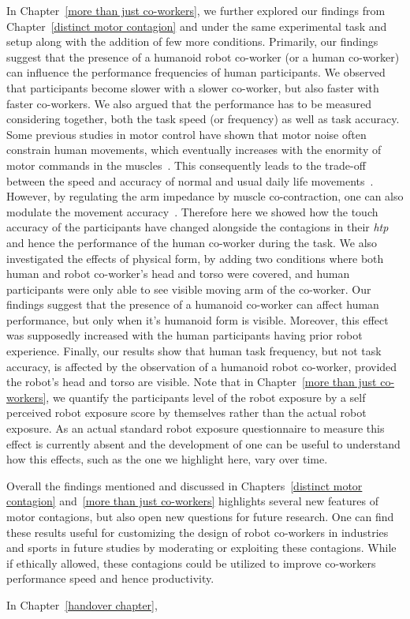 In Chapter~\ref{more than just co-workers}, we further explored our findings from Chapter~\ref{distinct motor contagion} and under the same experimental task and setup along with the addition of few more conditions. Primarily, our findings suggest that the presence of a humanoid robot co-worker (or a human co-worker) can influence the performance frequencies of human participants. We observed that participants become slower with a slower co-worker, but also faster with faster co-workers. We also argued that the performance has to be measured considering together, both the task speed (or frequency) as well as task accuracy. Some previous studies in motor control have shown that motor noise often constrain human movements, which eventually increases with the enormity of motor commands in the muscles~\cite{Harris:Nature:1998}. This consequently leads to the trade-off between the speed and accuracy of normal and usual daily life movements~\cite{Fitts:JEP:1954}. However, by regulating the arm impedance by muscle co-contraction, one can also modulate the movement accuracy~\cite{Burdet:nature:2001, Franklin:JoN:2008, Ganesh:RAS:2013}. Therefore here we showed how the touch accuracy of the participants have changed alongside the contagions in their {\it htp} and hence the performance of the human co-worker during the task. We also investigated the effects of physical form, by adding two conditions where both human and robot co-worker's head and torso were covered, and human participants were only able to see visible moving arm of the co-worker. Our findings suggest that the presence of a humanoid co-worker can affect human performance, but only when it's humanoid form is visible. Moreover, this effect was supposedly increased with the human participants having prior robot experience. Finally, our results show that human task frequency, but not task accuracy, is affected by the observation of a humanoid robot co-worker, provided the robot's head and torso are visible. Note that in Chapter~\ref{more than just co-workers}, we quantify the participants level of the robot exposure by a self perceived robot exposure score by themselves rather than the actual robot exposure. As an actual standard robot exposure questionnaire to measure this effect is currently absent and the development of one can be useful to understand how this effects, such as the one we highlight here, vary over time.

Overall the findings mentioned and discussed in Chapters~\ref{distinct motor contagion} and~\ref{more than just co-workers} highlights several new features of motor contagions, but also open new questions for future research. One can find these results useful for customizing the design of robot co-workers in industries and sports in future studies by moderating or exploiting these contagions. While if ethically allowed, these contagions could be utilized to improve co-workers performance speed and hence productivity.

In Chapter~\ref{handover chapter},

\clearpage %
\pagestyle{fancy}













